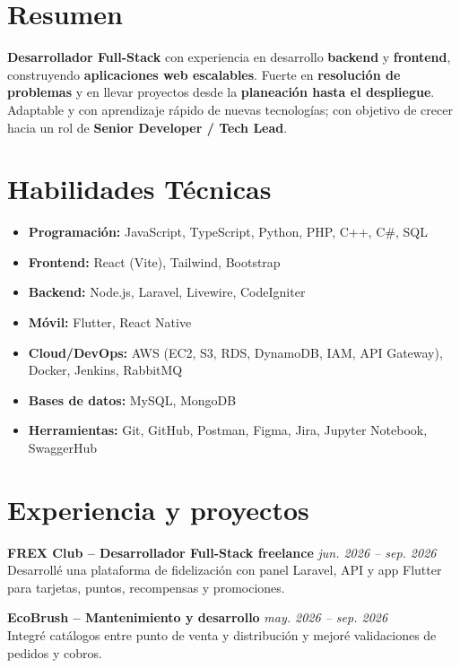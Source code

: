 \section{Resumen}
\textbf{Desarrollador Full-Stack} con experiencia en desarrollo \textbf{backend} y \textbf{frontend}, construyendo \textbf{aplicaciones web escalables}. Fuerte en \textbf{resoluci\'on de problemas} y en llevar proyectos desde la \textbf{planeaci\'on hasta el despliegue}. Adaptable y con aprendizaje r\'apido de nuevas tecnolog\'ias; con objetivo de crecer hacia un rol de \textbf{Senior Developer / Tech Lead}.

\section{Habilidades T\'ecnicas}
\begin{itemize}
    \item \textbf{Programaci\'on:} JavaScript, TypeScript, Python, PHP, C++, C\#, SQL
    \item \textbf{Frontend:} React (Vite), Tailwind, Bootstrap
    \item \textbf{Backend:} Node.js, Laravel, Livewire, CodeIgniter
    \item \textbf{M\'ovil:} Flutter, React Native
    \item \textbf{Cloud/DevOps:} AWS (EC2, S3, RDS, DynamoDB, IAM, API Gateway), Docker, Jenkins, RabbitMQ
    \item \textbf{Bases de datos:} MySQL, MongoDB
    \item \textbf{Herramientas:} Git, GitHub, Postman, Figma, Jira, Jupyter Notebook, SwaggerHub
\end{itemize}

\section{Experiencia y proyectos}
\textbf{FREX Club -- Desarrollador Full-Stack freelance} \hfill \textit{jun. 2026 -- sep. 2026}\\
Desarroll\'e una plataforma de fidelizaci\'on con panel Laravel, API y app Flutter para tarjetas, puntos, recompensas y promociones.

\textbf{EcoBrush -- Mantenimiento y desarrollo} \hfill \textit{may. 2026 -- sep. 2026}\\
Integr\'e cat\'alogos entre punto de venta y distribuci\'on y mejor\'e validaciones de pedidos y cobros.

